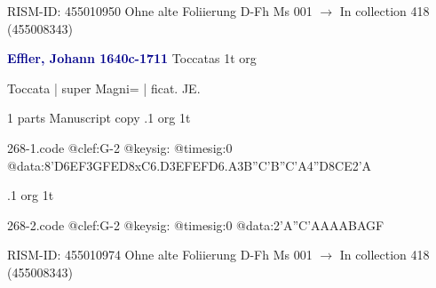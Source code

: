 \documentclass[twocolumn]{book}
\begin{document}
\newline RISM-ID: 455010950
\newline Ohne alte Foliierung
\newline D-Fh  Ms 001
\newline $\rightarrow$ In collection 418 (455008343)

\newline \par \vspace{7pt} \textcolor{darkblue}{\textbf{Effler, Johann  1640c-1711}}
\newline Toccatas  1t  
\newline org
\newline \begin{itshape}[f.91v, at left:] Toccata | super Magni= | ficat. JE.\end{itshape} 
\newline \textcolor{darkblue}{}  1 parts  
\newline Manuscript copy
.1  org  1t  
\begin{filecontents*}{268-1.code}
@clef:G-2
@keysig:
@timesig:0
@data:{8'D6EF}{3GFED}8xC{6.D3E}{FEFD}{6.A3B}{''C'B''C'A}4''D{8CE}2'A
\end{filecontents*}
\newline
%

.1  org  1t  
\begin{filecontents*}{268-2.code}
@clef:G-2
@keysig:
@timesig:0
@data:2'A''C'AAAABAGF
\end{filecontents*}
\newline
%

\newline RISM-ID: 455010974
\newline Ohne alte Foliierung
\newline D-Fh  Ms 001
\newline $\rightarrow$ In collection 418 (455008343)
\end{document}
